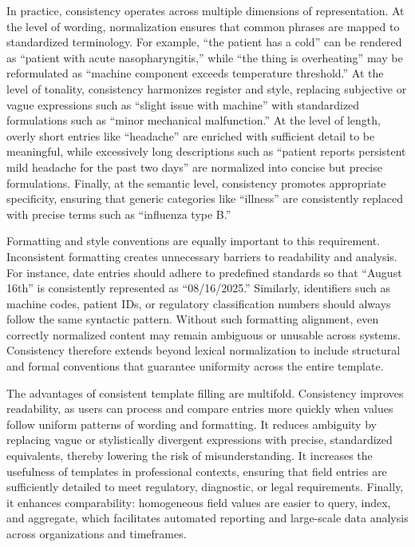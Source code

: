 In practice, consistency operates across multiple dimensions of representation. At the level of wording, normalization ensures that common phrases are mapped to standardized terminology. For example, “the patient has a cold” can be rendered as “patient with acute nasopharyngitis,” while “the thing is overheating” may be reformulated as “machine component exceeds temperature threshold.” At the level of tonality, consistency harmonizes register and style, replacing subjective or vague expressions such as “slight issue with machine” with standardized formulations such as “minor mechanical malfunction.” At the level of length, overly short entries like “headache” are enriched with sufficient detail to be meaningful, while excessively long descriptions such as “patient reports persistent mild headache for the past two days” are normalized into concise but precise formulations. Finally, at the semantic level, consistency promotes appropriate specificity, ensuring that generic categories like “illness” are consistently replaced with precise terms such as “influenza type B.”  

Formatting and style conventions are equally important to this requirement. Inconsistent formatting creates unnecessary barriers to readability and analysis. For instance, date entries should adhere to predefined standards so that “August 16th” is consistently represented as “08/16/2025.” Similarly, identifiers such as machine codes, patient IDs, or regulatory classification numbers should always follow the same syntactic pattern. Without such formatting alignment, even correctly normalized content may remain ambiguous or unusable across systems. Consistency therefore extends beyond lexical normalization to include structural and formal conventions that guarantee uniformity across the entire template.  

The advantages of consistent template filling are multifold. Consistency improves readability, as users can process and compare entries more quickly when values follow uniform patterns of wording and formatting. It reduces ambiguity by replacing vague or stylistically divergent expressions with precise, standardized equivalents, thereby lowering the risk of misunderstanding. It increases the usefulness of templates in professional contexts, ensuring that field entries are sufficiently detailed to meet regulatory, diagnostic, or legal requirements. Finally, it enhances comparability: homogeneous field values are easier to query, index, and aggregate, which facilitates automated reporting and large-scale data analysis across organizations and timeframes. 


